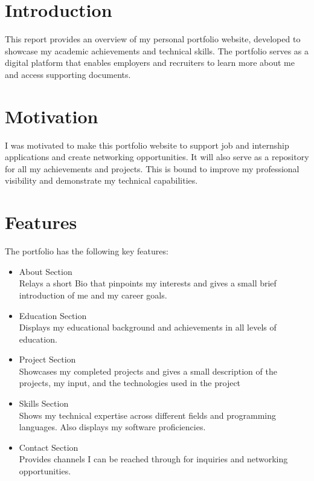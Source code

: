 \documentclass[12pt,a4paper,oneside]{report}
\begin{document}
\section{Introduction}
 This report provides an overview of my personal portfolio website, developed to showcase my academic achievements and technical skills. The portfolio serves as a digital platform that enables employers and recruiters to learn more about me and access supporting documents. 






\section{Motivation}
I was motivated to make this portfolio website to support job and internship applications and create networking opportunities. It will also serve as a repository for all my achievements and projects. This is bound to improve my professional visibility and demonstrate my technical capabilities. 


\section{Features}
The portfolio has the following key features:
\begin{itemize}
  \item About Section\\
  Relays a short Bio that pinpoints my interests and gives a small brief introduction of me and my career goals. 
  
  \item Education Section\\
  Displays my educational background and achievements in all levels of education.
  
  \item Project Section\\
  Showcases my completed projects and gives a small description of the projects, my input, and the technologies used in the project 
  
  \item Skills Section\\
  Shows my technical expertise across different fields and programming languages. Also displays my software proficiencies.
  \item Contact Section\\
  Provides channels I can be reached through for inquiries and networking opportunities. 
  
\end{itemize}
\end{document}
